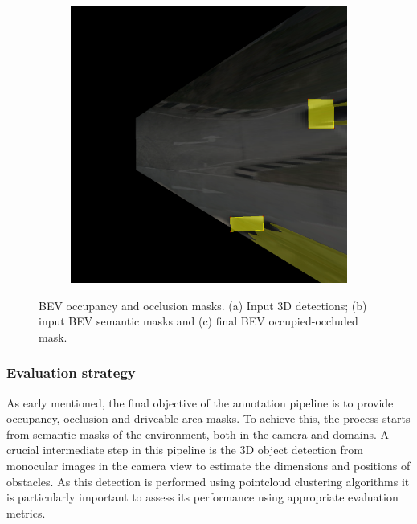 \begin{figure}[h!]
\begin{subfigure}[b]{0.3\textwidth}
        \caption{}
        \label{fig:bev_occupancy_occlusion_b}
    \end{subfigure}
    \hfill
    \begin{subfigure}[b]{0.3\textwidth}
        \includegraphics[width=\textwidth]{images/methodology/bev_occupancy_oclusion/bev_occ_9.png}
        \caption{}
        \label{fig:bev_occupancy_occlusion_c}
    \end{subfigure}

    \caption{BEV occupancy and occlusion masks. (a) Input 3D detections; (b) input BEV semantic masks and (c) final BEV occupied-occluded mask.}
    \label{fig:bev_occupancy_occlusion}
\end{figure}


\subsubsection{Evaluation strategy}
As early mentioned, the final objective of the annotation pipeline is to provide occupancy, occlusion and driveable area masks. To achieve this, the process starts from semantic masks of the environment, both in the camera and  domains. A crucial intermediate step in this pipeline is the 3D object detection from monocular images in the camera view to estimate the dimensions and positions of obstacles. As this detection is performed using pointcloud clustering algorithms it is particularly important to assess its performance using appropriate evaluation metrics.

